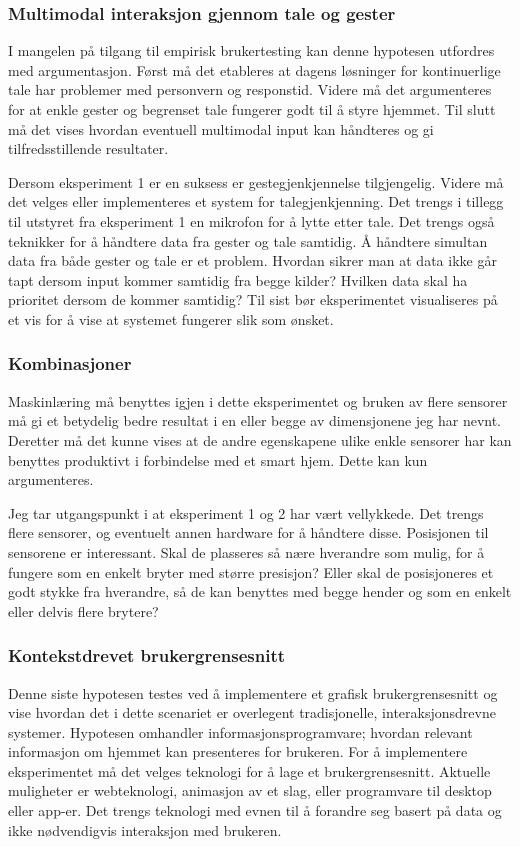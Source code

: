 \subsubsection*{Multimodal interaksjon gjennom tale og gester}
I mangelen på tilgang til empirisk brukertesting kan denne hypotesen utfordres med argumentasjon. Først må det etableres at dagens løsninger for kontinuerlige tale har problemer med personvern og responstid. Videre må det argumenteres for at enkle gester og begrenset tale fungerer godt til å styre hjemmet. Til slutt må det vises hvordan eventuell multimodal input kan håndteres og gi tilfredsstillende resultater.

Dersom eksperiment 1 er en suksess er gestegjenkjennelse tilgjengelig. Videre må det velges eller implementeres et system for talegjenkjenning. Det trengs i tillegg til utstyret fra eksperiment 1 en mikrofon for å lytte etter tale. Det trengs også teknikker for å håndtere data fra gester og tale samtidig. Å håndtere simultan data fra både gester og tale er et problem. Hvordan sikrer man at data ikke går tapt dersom input kommer samtidig fra begge kilder? Hvilken data skal ha prioritet dersom de kommer samtidig? Til sist bør eksperimentet visualiseres på et vis for å vise at systemet fungerer slik som ønsket.

\subsubsection*{Kombinasjoner}
Maskinlæring må benyttes igjen i dette eksperimentet og bruken av flere sensorer må gi et betydelig bedre resultat i en eller begge av dimensjonene jeg har nevnt. Deretter må det kunne vises at de andre egenskapene ulike enkle sensorer har kan benyttes produktivt i forbindelse med et smart hjem. Dette kan kun argumenteres.

Jeg tar utgangspunkt i at eksperiment 1 og 2 har vært vellykkede. Det trengs flere sensorer, og eventuelt annen hardware for å håndtere disse. Posisjonen til sensorene er interessant. Skal de plasseres så nære hverandre som mulig, for å fungere som en enkelt bryter med større presisjon? Eller skal de posisjoneres et godt stykke fra hverandre, så de kan benyttes med begge hender og som en enkelt eller delvis flere brytere?

\subsubsection*{Kontekstdrevet brukergrensesnitt}
Denne siste hypotesen testes ved å implementere et grafisk brukergrensesnitt og vise hvordan det i dette scenariet er overlegent tradisjonelle, interaksjonsdrevne systemer. Hypotesen omhandler informasjonsprogramvare; hvordan relevant informasjon om hjemmet kan presenteres for brukeren. For å implementere eksperimentet må det velges teknologi for å lage et brukergrensesnitt. Aktuelle muligheter er webteknologi, animasjon av et slag, eller programvare til desktop eller app-er. Det trengs teknologi med evnen til å forandre seg basert på data og ikke nødvendigvis interaksjon med brukeren. \\

